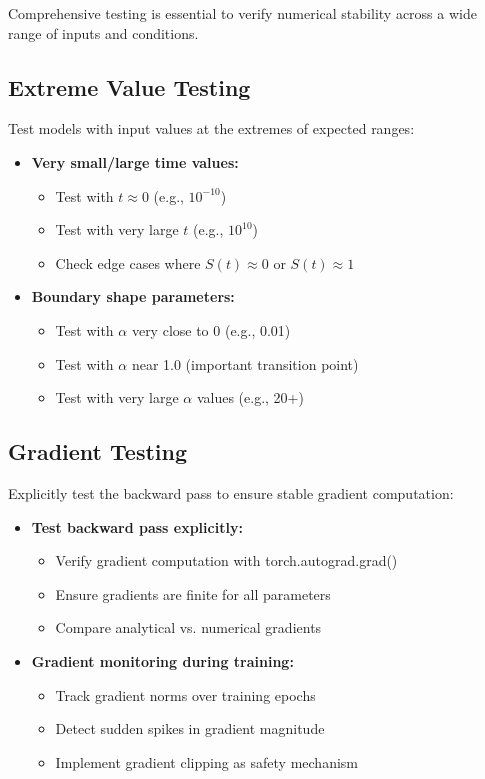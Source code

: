 Comprehensive testing is essential to verify numerical stability across a wide range of inputs and conditions.

\subsection{Extreme Value Testing}

Test models with input values at the extremes of expected ranges:

\begin{itemize}
    \item \textbf{Very small/large time values:}
    \begin{itemize}
        \item Test with $t \approx 0$ (e.g., $10^{-10}$)
        \item Test with very large $t$ (e.g., $10^{10}$)
        \item Check edge cases where $S(t) \approx 0$ or $S(t) \approx 1$
    \end{itemize}

    \item \textbf{Boundary shape parameters:}
    \begin{itemize}
        \item Test with $\alpha$ very close to 0 (e.g., 0.01)
        \item Test with $\alpha$ near 1.0 (important transition point)
        \item Test with very large $\alpha$ values (e.g., 20+)
    \end{itemize}
\end{itemize}

\subsection{Gradient Testing}

Explicitly test the backward pass to ensure stable gradient computation:

\begin{itemize}
    \item \textbf{Test backward pass explicitly:}
    \begin{itemize}
        \item Verify gradient computation with torch.autograd.grad()
        \item Ensure gradients are finite for all parameters
        \item Compare analytical vs. numerical gradients
    \end{itemize}

    \item \textbf{Gradient monitoring during training:}
    \begin{itemize}
        \item Track gradient norms over training epochs
        \item Detect sudden spikes in gradient magnitude
        \item Implement gradient clipping as safety mechanism
    \end{itemize}
\end{itemize}

